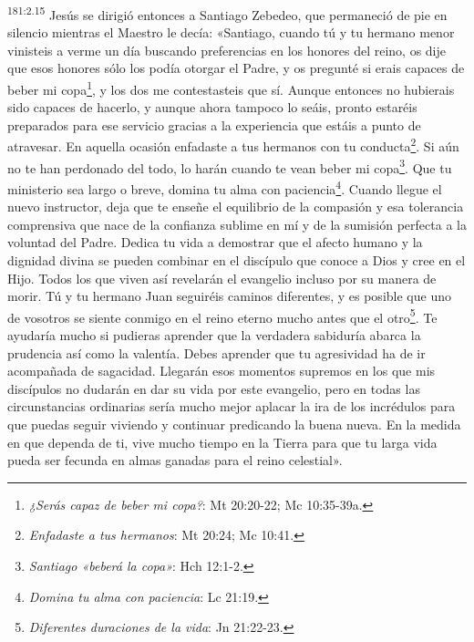 \par 
\textsuperscript{181:2.15} Jesús se dirigió entonces a Santiago Zebedeo, que permaneció de pie en silencio mientras el Maestro le decía: «Santiago, cuando tú y tu hermano menor vinisteis a verme un día buscando preferencias en los honores del reino, os dije que esos honores sólo los podía otorgar el Padre, y os pregunté si erais capaces de beber mi copa\footnote{\textit{¿Serás capaz de beber mi copa?}: Mt 20:20-22; Mc 10:35-39a.}, y los dos me contestasteis que sí. Aunque entonces no hubierais sido capaces de hacerlo, y aunque ahora tampoco lo seáis, pronto estaréis preparados para ese servicio gracias a la experiencia que estáis a punto de atravesar. En aquella ocasión enfadaste a tus hermanos con tu conducta\footnote{\textit{Enfadaste a tus hermanos}: Mt 20:24; Mc 10:41.}. Si aún no te han perdonado del todo, lo harán cuando te vean beber mi copa\footnote{\textit{Santiago «beberá la copa»}: Hch 12:1-2.}. Que tu ministerio sea largo o breve, domina tu alma con paciencia\footnote{\textit{Domina tu alma con paciencia}: Lc 21:19.}. Cuando llegue el nuevo instructor, deja que te enseñe el equilibrio de la compasión y esa tolerancia comprensiva que nace de la confianza sublime en mí y de la sumisión perfecta a la voluntad del Padre. Dedica tu vida a demostrar que el afecto humano y la dignidad divina se pueden combinar en el discípulo que conoce a Dios y cree en el Hijo. Todos los que viven así revelarán el evangelio incluso por su manera de morir. Tú y tu hermano Juan seguiréis caminos diferentes, y es posible que uno de vosotros se siente conmigo en el reino eterno mucho antes que el otro\footnote{\textit{Diferentes duraciones de la vida}: Jn 21:22-23.}. Te ayudaría mucho si pudieras aprender que la verdadera sabiduría abarca la prudencia así como la valentía. Debes aprender que tu agresividad ha de ir acompañada de sagacidad. Llegarán esos momentos supremos en los que mis discípulos no dudarán en dar su vida por este evangelio, pero en todas las circunstancias ordinarias sería mucho mejor aplacar la ira de los incrédulos para que puedas seguir viviendo y continuar predicando la buena nueva. En la medida en que dependa de ti, vive mucho tiempo en la Tierra para que tu larga vida pueda ser fecunda en almas ganadas para el reino celestial».

